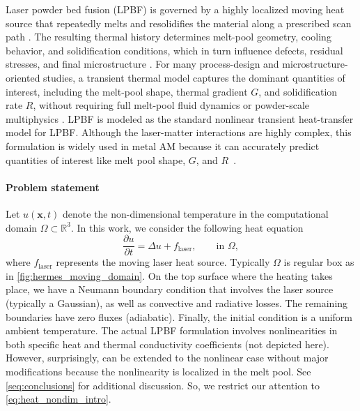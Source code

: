 \documentclass[conference]{IEEEtran}
\begin{document}
Laser powder bed fusion (LPBF) is governed by a highly localized moving heat source that repeatedly melts and resolidifies the material along a prescribed scan path \cite{debroy2018additive, bikas2016additive}. The resulting thermal history determines melt-pool geometry, cooling behavior, and solidification conditions, which in turn influence defects, residual stresses, and final microstructure \cite{qin2023grainnn, qin2024graingnn, chadwick2021development, basak2016epitaxy}. For many process-design and microstructure-oriented studies, a transient thermal model captures the dominant quantities of interest, including the melt-pool shape, thermal gradient $G$, and solidification rate $R$, without requiring full melt-pool fluid dynamics or powder-scale multiphysics \cite{debroy2018additive,bikas2016additive}. 
LPBF is modeled as the standard nonlinear transient heat-transfer model for LPBF. 
Although the laser-matter interactions are highly complex, this formulation is widely used in metal AM because it can accurately predict quantities of interest like melt pool shape, $G$, and $R$~\cite{leonor2024go, keller2017application,debroy2018additive}. 

\paragraph{Problem statement}
Let $u(\mathbf{x},t)$ denote the non-dimensional temperature in the computational domain $\Omega \subset \mathbb{R}^3$. In this work, we consider the following heat equation
\begin{equation}
\frac{\partial u}{\partial t} = \Delta u + f_{\text{laser}},
\qquad \text{in } \Omega,
\label{eq:heat_nondim_intro}
\end{equation}
where $f_{\text{laser}}$ represents the moving laser heat source. 
Typically $\Omega$ is regular box as in \cref{fig:hermes_moving_domain}. 
On the top surface where the heating takes place, we have a Neumann boundary condition that involves the laser source (typically a Gaussian), as well as convective and radiative losses.
The remaining boundaries have zero fluxes (adiabatic). Finally, the initial condition is a uniform ambient temperature. 
The actual LPBF formulation involves nonlinearities in both specific heat and thermal conductivity coefficients (not depicted here). 
However, surprisingly, \method can be extended to the nonlinear case without major modifications because the nonlinearity is localized in the melt pool. See \cref{seq:conclusions} for  additional discussion. So, we restrict our attention to  \cref{eq:heat_nondim_intro}.
\end{document}
